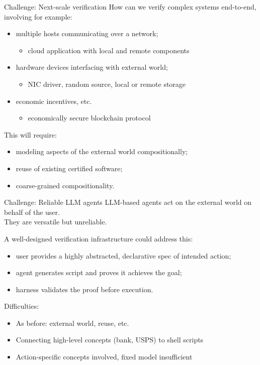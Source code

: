 \documentclass[aspectratio=1610,mathserif]{beamer}
\begin{document}
\begin{frame}{Challenge: Next-scale verification} %
  How can we verify complex systems end-to-end, involving for example:
  \begin{itemize}
    \item multiple hosts communicating over a network;
    \begin{itemize}
      \item cloud application with local and remote components
    \end{itemize}
    \pause
    \item hardware devices interfacing with external world;
    \begin{itemize}
      \item NIC driver, random source, local or remote storage
    \end{itemize}
    \pause
    \item economic incentives, etc.
    \begin{itemize}
      \item economically secure blockchain protocol
    \end{itemize}
  \end{itemize}

  \vfill\pause
  This will require:
  \begin{itemize}
    \item modeling aspects of the external world compositionally;
    \item reuse of existing certified software;
    \item coarse-grained compositionality.
  \end{itemize}
\end{frame}

\begin{frame}{Challenge: Reliable LLM agents} %
  LLM-based agents act on the external world on behalf of the user. \\
  They are versatile but unreliable.

  \vfill\pause
  A well-designed verification infrastructure could address this:
  \begin{itemize}
    \item user provides a highly abstracted, declarative spec of intended action;
    \item agent generates script and proves it achieves the goal;
    \item harness validates the proof before execution.
  \end{itemize}

  \vfill\pause
  Difficulties:
  \begin{itemize}
    \item As before: external world, reuse, etc.
    \item Connecting high-level concepts (bank, USPS) to shell scripts
    \item Action-specific concepts involved, fixed model insufficient
  \end{itemize}
\end{frame}
\end{document}
